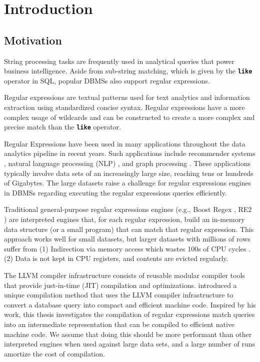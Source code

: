 
\chapter{Introduction}\label{chapter:introduction}

\section{Motivation}
String processing tasks are frequently used in analytical queries that power business intelligence. Aside from sub-string matching, which is given by the \texttt{\textbf{like}} operator in SQL, popular DBMSs also support regular expressions.

Regular expressions are textual patterns used for text analytics and information extraction using standardized concise syntax. Regular expressions have a more complex usage of wildcards and can be constructed to create a more complex and precise match than the \texttt{\textbf{like}} operator. 

Regular Expressions have been used in many applications throughout the data analytics pipeline in recent years. Such applications include recommender systems \cite{recsys1}, natural language processing (NLP) \cite{nlp1, nlp2}, and graph processing \cite{graph1}. These applications typically involve data sets of an increasingly large size, reaching tens or hundreds of Gigabytes. The large datasets raise a challenge for regular expressions engines in DBMSs regarding executing the regular expressions queries efficiently.

Traditional general-purpose regular expressions engines (e.g., Boost Regex \cite{Boost}, RE2 \cite{re2}) are interpreted engines that, for each regular expression, build an in-memory data structure (or a small program) that can match that regular expression. This approach works well for small datasets, but larger datasets with millions of rows suffer from (1) Indirection via memory access which wastes 100s of CPU cycles \cite{cpumemgap}. (2) Data is not kept in CPU registers, and contents are evicted regularly.

The LLVM compiler infrastructure \cite{llvm} consists of reusable modular compiler tools that provide just-in-time (JIT) compilation and optimizations. \citet{querycomp} introduced a unique compilation method that uses the LLVM compiler infrastructure to convert a database query into compact and efficient machine code. Inspired by his work, this thesis investigates the compilation of regular expressions match queries into an intermediate representation that can be compiled to efficient native machine code. We assume that doing this should be more performant than other interpreted engines when used against large data sets, and a large number of runs amortize the cost of compilation.

